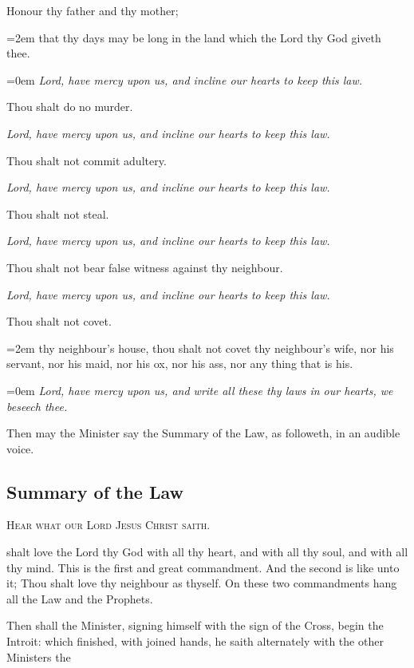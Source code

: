     \par\noindent
    Honour thy father and thy mother;
    \par\noindent
    \leftskip=2em
	{\small{that thy days may be long in the land which the Lord thy God giveth thee.}}
	\par
	\leftskip=0em
    \textit{Lord, have mercy upon us, and incline our hearts to keep this law.}
    \par\noindent
    Thou shalt do no murder.\par
    \textit{Lord, have mercy upon us, and incline our hearts to keep this law.}
    \par\noindent
    Thou shalt not commit adultery.\par
    \textit{Lord, have mercy upon us, and incline our hearts to keep this law.}
\par\noindent
    Thou shalt not steal.\par
    \textit{Lord, have mercy upon us, and incline our hearts to keep this law.}
\par\noindent
    Thou shalt not bear false witness against thy neighbour.\par
    \textit{Lord, have mercy upon us, and incline our hearts to keep this law.}
    \par\noindent
    Thou shalt not covet.
    \par\noindent
    \leftskip=2em
	{\small{thy neighbour's house, thou shalt not covet thy neighbour's wife, nor his servant, nor his maid, nor his ox, nor his ass, nor any thing that is his.}}
	\par
	\leftskip=0em
	\textit{Lord, have mercy upon us, and write all these thy laws in our hearts, we beseech thee.}
	
\begin{rubric}
	Then may the Minister say the Summary of the Law, as followeth, in an audible voice.
\end{rubric}
\subsection{Summary of the Law}
\begin{center}
	{\textsc{Hear what our Lord Jesus Christ saith.}}
\end{center}

 shalt love the Lord thy God with all thy heart, and with all thy soul, and with all thy mind. This is the first and great commandment. And the second is like unto it; Thou shalt love thy neighbour as thyself. On these two commandments hang all the Law and the Prophets.
\begin{rubric}
    Then shall the Minister, signing himself with the sign of the Cross, begin the Introit: which finished, with joined hands, he saith alternately with the other Ministers the 
\end{rubric}
